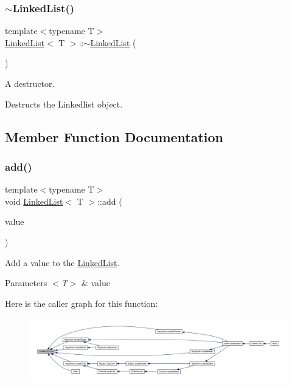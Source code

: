 \subsubsection{\texorpdfstring{$\sim$\+Linked\+List()}{~LinkedList()}}
{\footnotesize\ttfamily template$<$typename T$>$ \\
\mbox{\hyperlink{class_linked_list}{Linked\+List}}$<$ T $>$\+::$\sim$\mbox{\hyperlink{class_linked_list}{Linked\+List}} (\begin{DoxyParamCaption}{ }\end{DoxyParamCaption})\hspace{0.3cm}{\ttfamily [inline]}}



A destructor. 

Destructs the Linkedlist object. 

\subsection{Member Function Documentation}
\mbox{\label{class_linked_list_a188425c092c410b45ab70a3d396aff67}} 
\subsubsection{\texorpdfstring{add()}{add()}}
{\footnotesize\ttfamily template$<$typename T$>$ \\
void \mbox{\hyperlink{class_linked_list}{Linked\+List}}$<$ T $>$\+::add (\begin{DoxyParamCaption}\item[{T}]{value }\end{DoxyParamCaption})\hspace{0.3cm}{\ttfamily [inline]}}



Add a value to the \mbox{\hyperlink{class_linked_list}{Linked\+List}}. 


\begin{DoxyParams}{Parameters}
{\em $<$\+T$>$} & value \\
\hline
\end{DoxyParams}
Here is the caller graph for this function\+:\nopagebreak
\begin{figure}[H]
\begin{center}
\leavevmode
\includegraphics[width=350pt]{class_linked_list_a188425c092c410b45ab70a3d396aff67_icgraph}
\end{center}
\end{figure}
\mbox{\label{class_linked_list_a23f2995817766b699c45a02d0040d741}} 
